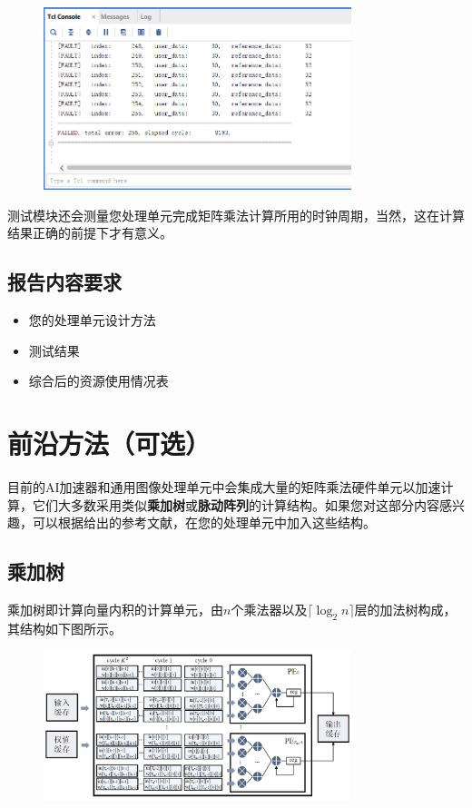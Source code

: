 \documentclass{ctexart}
\begin{document}
\begin{figure}[H]
    \centering
    \includegraphics[width=0.8\textwidth]{lab4/14.png}
\end{figure}

测试模块还会测量您处理单元完成矩阵乘法计算所用的时钟周期，当然，这在计算结果正确的前提下才有意义。

\subsection{报告内容要求}

\begin{itemize}
    \item 您的处理单元设计方法
    \item 测试结果
    \item 综合后的资源使用情况表
\end{itemize}


\section{前沿方法（可选）}

目前的AI加速器和通用图像处理单元中会集成大量的矩阵乘法硬件单元以加速计算，它们大多数采用类似\textbf{乘加树}或\textbf{脉动阵列}的计算结构。如果您对这部分内容感兴趣，可以根据给出的参考文献，在您的处理单元中加入这些结构。

\subsection{乘加树}

乘加树即计算向量内积的计算单元，由$n$个乘法器以及$\lceil \log_{2}{n} \rceil$层的加法树构成，其结构如下图所示。

\begin{figure}[H]
    \centering
    \includegraphics[width=0.8\textwidth]{lab4/10.png}
\end{figure}
\end{document}
